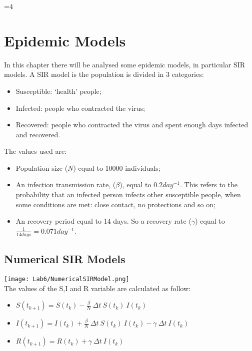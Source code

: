 \documentclass[twocolumn,letterpaper]{report}
\newcounter{debug}
\begin{document}
\ifnum\value{debug}=4 {
    
\chapter{Epidemic Models}
	In this chapter there will be analysed some epidemic models, in particular SIR models. A SIR model is the population is divided in 3 categories:
	\begin{itemize}
					\item Susceptible: `health' people;
					\item Infected: people who contracted the virus;
					\item Recovered: people who contracted the virus and spent enough days infected and recovered.
				\end{itemize}
				
	The values used are:
	\begin{itemize}
					\item Population size ($N$) equal to 10000 individuals;
					\item An infection transmission rate, ($\beta$), equal to $0.2 day^{-1}$. This refers to the probability that an infected person infects other susceptible people, when some conditions are met: close contact, no protections and so on;
					\item An recovery period equal to 14 days. So a recovery rate ($\gamma$) equal to $\frac{1}{14 days}=0.071 day^{-1}$.
				\end{itemize}
				
				
	 \section{Numerical SIR Models}
	 						\texttt{[image: Lab6/NumericalSIRModel.png]} \\
								The values of the S,I and R variable are calculated as follow:
								\begin{itemize}
								  \item[] \hspace{5cm} $S(t_{k+1}) = S(t_{k}) - \frac{\beta}{N} \: \Delta t \: S(t_{k}) \: I(t_{k})$
									\item[] \hspace{5cm} $I(t_{k+1}) = I(t_{k}) + \frac{\beta}{N} \: \Delta t \: S(t_{k}) \: I(t_{k}) - \gamma \: \Delta t \: I(t_k)$
									\item[] \hspace{5cm} $R(t_{k+1}) = R(t_{k}) + \gamma \: \Delta t \: I(t_k)$
								\end{itemize}
								
}
\end{document}
